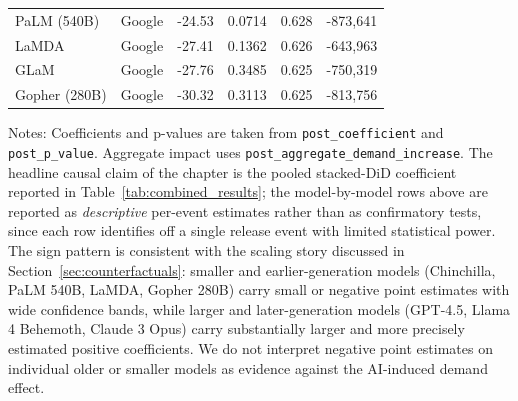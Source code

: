 \documentclass[a4paper,fleqn,longmktitle]{cas-sc}
\begin{document}
\begin{table}[htbp]
{\begin{threeparttable}
\begin{tabular}{l l r r r r}
PaLM (540B)                    & Google     & -24.53 & 0.0714                & 0.628 &  -873,641 \\
LaMDA                          & Google     & -27.41 & 0.1362                & 0.626 &  -643,963 \\
GLaM                           & Google     & -27.76 & 0.3485                & 0.625 &  -750,319 \\
Gopher (280B)                  & Google     & -30.32 & 0.3113                & 0.625 &  -813,756 \\
\bottomrule
\end{tabular}
\begin{tablenotes}
\item Notes: Coefficients and p-values are taken from \texttt{post\_coefficient} and \texttt{post\_p\_value}. Aggregate impact uses \texttt{post\_aggregate\_demand\_increase}. The headline causal claim of the chapter is the pooled stacked-DiD coefficient reported in Table~\ref{tab:combined_results}; the model-by-model rows above are reported as \emph{descriptive} per-event estimates rather than as confirmatory tests, since each row identifies off a single release event with limited statistical power. The sign pattern is consistent with the scaling story discussed in Section~\ref{sec:counterfactuals}: smaller and earlier-generation models (Chinchilla, PaLM 540B, LaMDA, Gopher 280B) carry small or negative point estimates with wide confidence bands, while larger and later-generation models (GPT-4.5, Llama 4 Behemoth, Claude 3 Opus) carry substantially larger and more precisely estimated positive coefficients. We do not interpret negative point estimates on individual older or smaller models as evidence against the AI-induced demand effect.
\end{tablenotes}
\end{threeparttable}}
\label{PostTreatment}
\end{table}
\end{document}
